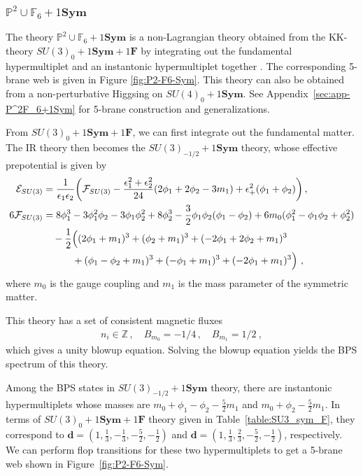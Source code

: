 \subsubsection{\texorpdfstring{$ \mathbb{P}^2 \cup \mathbb{F}_6 + 1\mathbf{Sym} $}{P2 U F6 + 1Sym}}

The theory $ \mathbb{P}^2 \cup \mathbb{F}_6 + 1\mathbf{Sym} $ is a non-Lagrangian theory obtained from the KK-theory $ SU(3)_0 + 1\mathbf{Sym} + 1\mathbf{F} $ by integrating out the fundamental hypermultiplet and an instantonic hypermultiplet together \cite{Bhardwaj:2019jtr}. The corresponding 5-brane web is given in Figure \ref{fig:P2-F6-Sym}. This theory can also be obtained from a non-perturbative Higgsing on  $SU(4)_0+1\mathbf{Sym}$. See Appendix~\ref{sec:app-P^2F_6+1Sym} for 5-brane construction and generalizations.

From $ SU(3)_0 + 1\mathbf{Sym} + 1\mathbf{F} $, we can first integrate out the fundamental matter. The IR theory then becomes the $ SU(3)_{-1/2} + 1\mathbf{Sym} $ theory, whose effective prepotential is given by
\begin{align}
\mathcal{E}_{SU(3)} & = \frac{1}{\epsilon_1 \epsilon_2} \qty( \mathcal{F}_{SU(3)} - \frac{\epsilon_1^2 + \epsilon_2^2}{24}(2\phi_1 + 2\phi_2 - 3m_1) + \epsilon_+^2 (\phi_1 + \phi_2))
 \,, \nonumber \\
6\mathcal{F}_{SU(3)}
&= 8\phi_1^3 - 3\phi_1^2 \phi_2 - 3\phi_1 \phi_2^2 + 8\phi_2^3 - \frac{3}{2} \phi_1 \phi_2 (\phi_1 - \phi_2) + 6m_0 (\phi_1^2 - \phi_1 \phi_2 + \phi_2^2) \nonumber \\
& \quad - \frac{1}{2} \Big( (2\phi_1 + m_1)^3 + (\phi_2 + m_1)^3 + (-2\phi_1 + 2\phi_2 + m_1)^3 \nonumber \\
& \qquad \quad + (\phi_1 - \phi_2 + m_1)^3 + (-\phi_1 + m_1)^3 + (-2\phi_1 + m_1)^3 \Big)\ ,
\end{align}
where $ m_0 $ is the gauge coupling and $ m_1 $ is the mass parameter of the symmetric matter. 

This theory has a set of consistent magnetic fluxes
\begin{align}
n_i \in \mathbb{Z} \, , \quad
B_{m_0} = -1/4 \, , \quad
B_{m_1} = 1/2 \ ,
\end{align}
which gives a unity blowup equation. Solving the blowup equation yields the BPS spectrum of this theory.

Among the BPS states in $ SU(3)_{-1/2} + 1\mathbf{Sym} $ theory, there are instantonic hypermultiplets whose masses are $ m_0 + \phi_1 - \phi_2 - \frac{5}{2}m_1 $ and $ m_0 + \phi_2 - \frac{5}{2}m_1 $. In terms of $ SU(3)_0 + 1\mathbf{Sym} + 1\mathbf{F} $ theory given in Table~\ref{table:SU3_sym_F}, they correspond to $ \mathbf{d} = (1, \frac{1}{3}, -\frac{1}{3}, -\frac{5}{2}, -\frac{1}{2}) $ and $ \mathbf{d} = (1, \frac{1}{3}, \frac{2}{3}, -\frac{5}{2}, -\frac{1}{2}) $, respectively. We can perform flop transitions for these two hypermultiplets to get a 5-brane web shown in Figure~\ref{fig:P2-F6-Sym}.

